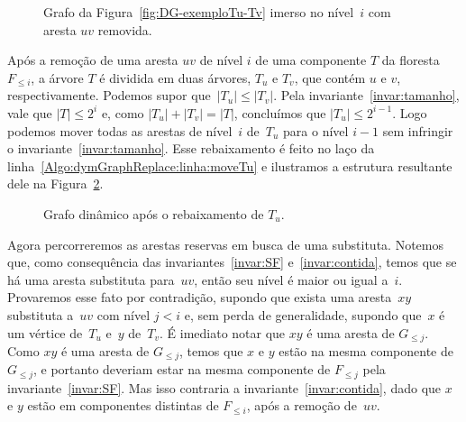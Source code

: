 \newpage
\begin{figure}[htb]
\centering
\caption{Grafo da Figura~\ref{fig:DG-exemploTu-Tv} imerso no nível~$i$ com aresta $uv$ removida.}
\label{fig:DG-antes-de-rebaixar}
\end{figure}

Após a remoção de uma aresta $uv$ de nível $i$ de uma componente $T$ da floresta $F_{\leqslant i}$, a árvore $T$ é dividida em duas árvores, $T_u$ e $T_v$, que contém $u$ e $v$, respectivamente. Podemos supor que~$|T_u|\leqslant |T_v|$. Pela invariante~\ref{invar:tamanho}, vale que $|T| \leq 2^i$ e, como ${|T_u| + |T_v| = |T|}$, concluímos que $|T_u| \leq 2^{i-1}$. Logo podemos mover todas as arestas de nível~$i$ de~$T_u$ para o nível $i-1$ sem infringir o invariante~\ref{invar:tamanho}.
Esse rebaixamento é feito no laço da linha~\ref{Algo:dymGraphReplace:linha:moveTu} e ilustramos a estrutura resultante dele na Figura~\ref{fig:DG-depois-de-rebaixar}.

\begin{figure}[htb]
\centering
\caption{Grafo dinâmico após o rebaixamento de $T_u$.}
\label{fig:DG-depois-de-rebaixar}
\end{figure}

Agora percorreremos as arestas reservas em busca de uma substituta. Notemos que, como consequência das invariantes~\ref{invar:SF} e~\ref{invar:contida}, temos que se há uma aresta substituta para~$uv$, então seu nível é maior ou igual a~$i$. Provaremos esse fato por contradição, supondo que exista uma aresta~$xy$ substituta a~$uv$ com nível $j<i$ e, sem perda de generalidade, supondo que~$x$ é um vértice de~$T_u$ e~$y$ de~$T_v$. É imediato notar que $xy$ é uma aresta de $G_{\leqslant j}$. Como $xy$ é uma aresta de $G_{\leqslant j}$, temos que $x$ e $y$ estão na mesma componente de $G_{\leqslant j}$, e portanto deveriam estar na mesma componente de $F_{\leqslant j}$ pela invariante~\ref{invar:SF}. Mas isso contraria a invariante~\ref{invar:contida}, dado que $x$ e $y$ estão em componentes distintas de $F_{\leqslant i}$, após a remoção de~$uv$.

